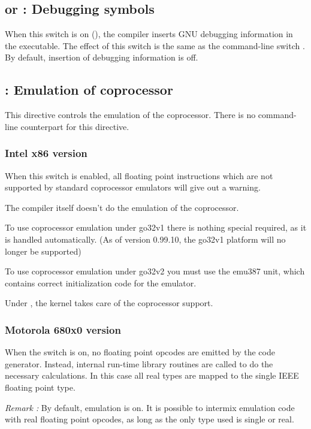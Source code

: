 \documentclass{report}
\begin{document}
\subsection{ or : Debugging symbols}

When this switch is on (), 
the compiler inserts GNU debugging information in
the executable. The effect of this switch is the same as the command-line
switch . By default, insertion of debugging information is off.

\subsection{ : Emulation of coprocessor}

This directive controls the emulation of the coprocessor. There is no
command-line counterpart for this directive.

\subsubsection{ Intel x86 version }

When this switch is enabled, all floating point instructions
which are not supported by standard coprocessor emulators will give out
a warning.

The compiler itself doesn't do the emulation of the coprocessor.

To use coprocessor emulation under \dos go32v1 there is nothing special
required, as it is handled automatically. (As of version 0.99.10, the 
go32v1 platform will no longer be supported)

To use coprocessor emulation under \dos go32v2 you must use the
emu387 unit, which contains correct initialization code for the
emulator.

Under \linux, the kernel takes care of the coprocessor support.

\subsubsection{ Motorola 680x0 version }

When the switch is on, no floating point opcodes are emitted
by the code generator. Instead, internal run-time library routines
are called to do the necessary calculations. In this case all
real types are mapped to the single IEEE floating point type.

\emph{ Remark : } By default, emulation is on. It is possible to
intermix emulation code with real floating point opcodes, as
long as the only type used is single or real.
\end{document}
